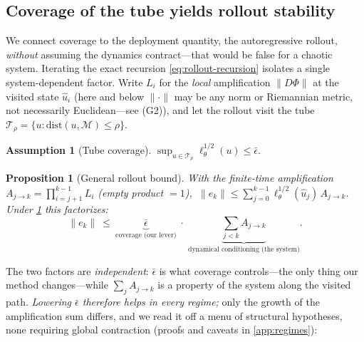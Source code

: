 \documentclass{article}
\theoremstyle{plain}
\newtheorem{proposition}{Proposition}
\theoremstyle{definition}
\newtheorem{assumption}{Assumption}
\theoremstyle{remark}
\newcommand{\state}{u}
\newcommand{\manifold}{\mathcal{M}}
\newcommand{\sol}{\Phi}
\newcommand{\lossf}{\ell_\theta}
\newcommand{\tube}{\mathcal{T}_{\rho}}
\newcommand{\dist}{\mathrm{dist}}
\begin{document}
\subsection{Coverage of the tube yields rollout stability}\label{sec:method-rollout}
We connect coverage to the deployment quantity, the autoregressive rollout, \emph{without} assuming the
dynamics contract---that would be false for a chaotic system. Iterating the exact recursion
\eqref{eq:rollout-recursion} isolates a single system-dependent factor. Write $L_i$ for the \emph{local}
amplification $\|D\sol\|$ at the visited state $\hat\state_i$ (here and below $\|\cdot\|$ may be any norm or
Riemannian metric, not necessarily Euclidean---see (G2)), and let the rollout visit the tube
$\tube=\{\state:\dist(\state,\manifold)\le\rho\}$.
\begin{assumption}[Tube coverage]\label{ass:tube}
$\displaystyle\sup_{\state\in\tube}\lossf^{1/2}(\state)\le \bar\epsilon.$
\end{assumption}
\begin{proposition}[General rollout bound]\label{prop:gronwall}
With the finite-time amplification $A_{j\to k}=\prod_{i=j+1}^{k-1}L_i$ (empty product $=1$),
$\ \|e_k\|\le\sum_{j=0}^{k-1}\lossf^{1/2}(\hat\state_j)\,A_{j\to k}$. Under \cref{ass:tube} this factorizes:
\[
  \|e_k\|\ \le\ \underbrace{\bar\epsilon}_{\text{coverage (our lever)}}\;\cdot\;
  \underbrace{\textstyle\sum_{j<k}A_{j\to k}}_{\text{dynamical conditioning (the system)}}.
\]
\end{proposition}
The two factors are \emph{independent}: $\bar\epsilon$ is what coverage controls---the only thing our method
changes---while $\sum_j A_{j\to k}$ is a property of the system along the visited path. \emph{Lowering
$\bar\epsilon$ therefore helps in every regime;} only the growth of the amplification sum differs, and we
read it off a menu of structural hypotheses, none requiring global contraction (proofs and caveats in
\cref{app:regimes}):
\end{document}
